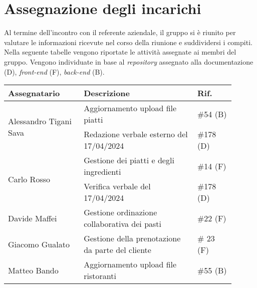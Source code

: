 \section{Assegnazione degli incarichi}
Al termine dell'incontro con il referente aziendale, il gruppo si è riunito per valutare le informazioni ricevute nel corso della riunione e suddividersi i compiti.\\
Nella seguente tabelle vengono riportate le attività assegnate ai membri del gruppo.
Vengono individuate in base al \textit{repository} assegnato alla documentazione (D), \textit{front-end} (F), \textit{back-end} (B).

\begin{center}
	{
		\renewcommand{\arraystretch}{1.5}
		\begin{tabular}{p{0.30\linewidth}|p{0.45\linewidth}|p{0.15\linewidth}}
			\textbf{Assegnatario}          			& \textbf{Descrizione}					& \textbf{Rif.} \\
			\hline
			\multirow{2}{*}{Alessandro Tigani Sava}	& Aggiornamento upload file	piatti 		& \#54 (B)	\\
			\cline{2-3}
													& Redazione verbale esterno del 17/04/2024	& \#178	(D)	\\
			\hline
			\multirow{2}{*}{Carlo Rosso}   			& Gestione dei piatti e degli ingredienti	& \#14 (F)	\\
			\cline{2-3}
			                               			& Verifica verbale del 17/04/2024		& \#178	(D)	\\
			\hline
			Davide Maffei							& Gestione ordinazione collaborativa dei pasti	& \#22 (F)	\\
			\hline
			Giacomo Gualato							& Gestione della prenotazione da parte del cliente	& \# 23 (F)	\\
			\hline
			Matteo Bando  							& Aggiornamento upload file	ristoranti	& \#55 (B)	\\
			\hline
		\end{tabular}
	}
\end{center}
